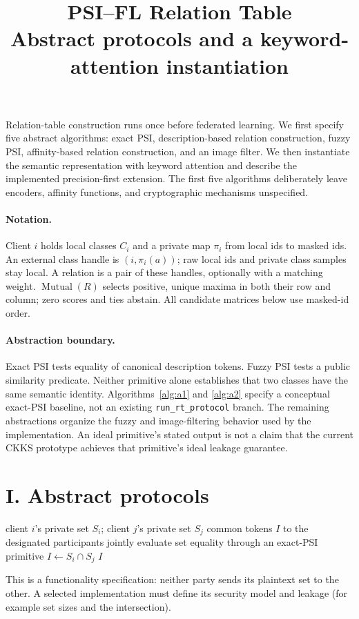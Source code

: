 \documentclass[11pt]{article}
\title{PSI--FL Relation Table\\\large Abstract protocols and a keyword-attention instantiation}
\author{}\date{}
\begin{document}
\maketitle
\noindent Relation-table construction runs once before federated learning.
We first specify five abstract algorithms: exact PSI, description-based
relation construction, fuzzy PSI, affinity-based relation construction, and
an image filter. We then instantiate the semantic representation with keyword
attention and describe the implemented precision-first extension.
The first five algorithms deliberately leave encoders, affinity functions,
and cryptographic mechanisms unspecified.

\paragraph{Notation.}
Client $i$ holds local classes $C_i$ and a private map $\pi_i$ from local ids
to masked ids. An external class handle is $(i,\pi_i(a))$; raw local ids and
private class samples stay local. A relation is a pair of these handles,
optionally with a matching weight. $\operatorname{Mutual}(R)$ selects positive,
unique maxima in both their row and column; zero scores and ties abstain.
All candidate matrices below use masked-id order.

\paragraph{Abstraction boundary.}
Exact PSI tests equality of canonical description tokens. Fuzzy PSI tests a
public similarity predicate. Neither primitive alone establishes that two
classes have the same semantic identity. Algorithms~\ref{alg:a1} and
\ref{alg:a2} specify a conceptual exact-PSI baseline, not an existing
\texttt{run\_rt\_protocol} branch. The remaining abstractions organize the
fuzzy and image-filtering behavior used by the implementation.
An ideal primitive's stated output is not a claim that the current CKKS
prototype achieves that primitive's ideal leakage guarantee.

\section*{I. Abstract protocols}
\begin{algorithm}[H]
\caption{Simple exact PSI (abstract primitive)}\label{alg:a1}
\small\begin{algorithmic}[1]
\Require client $i$'s private set $S_i$; client $j$'s private set $S_j$
\Ensure common tokens $I$ to the designated participants
 \State jointly evaluate set equality through an exact-PSI primitive
 \State $I\gets S_i\cap S_j$
 \State \Return $I$
\EndProcedure
\end{algorithmic}
\smallskip\noindent\small
This is a functionality specification: neither party sends its plaintext set
to the other. A selected implementation must define its security model and
leakage (for example set sizes and the intersection).
\end{algorithm}
\end{document}
